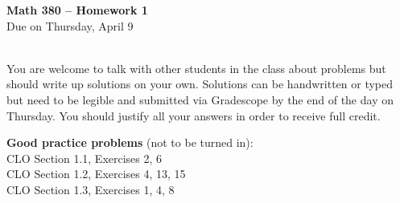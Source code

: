 \documentclass[12pt]{amsart}
\theoremstyle{definition}
\begin{document}
 \thispagestyle{empty}
\begin{center} {\large \textbf{Math 380 -- Homework  1}} \smallskip \\ 
Due on Thursday, April 9\ \\ \ \\
 \end{center}

You are welcome to talk with other students in the class about problems but should write up solutions on your own. 
Solutions can be handwritten or typed but need to be legible and submitted via Gradescope by the end of the day 
on Thursday. You should justify all your answers in order to receive full credit.  
\bigskip 

\begin{flushleft}

{\bf Good practice problems} (not to be turned in): \\
CLO Section 1.1, Exercises 2, 6\\
CLO Section 1.2, Exercises 4, 13, 15\\
CLO Section 1.3, Exercises 1, 4, 8\\
\bigskip 





\end{flushleft}
\end{document}

